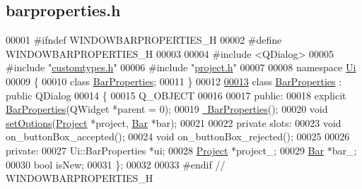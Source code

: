 \hypertarget{barproperties_8h_source}{}\subsection{barproperties.\+h}
\label{barproperties_8h_source}

\begin{DoxyCode}
00001 \textcolor{preprocessor}{#ifndef WINDOWBARPROPERTIES\_H}
00002 \textcolor{preprocessor}{#define WINDOWBARPROPERTIES\_H}
00003 
00004 \textcolor{preprocessor}{#include <QDialog>}
00005 \textcolor{preprocessor}{#include "\hyperlink{customtypes_8h}{customtypes.h}"}
00006 \textcolor{preprocessor}{#include "\hyperlink{project_8h}{project.h}"}
00007 
00008 \textcolor{keyword}{namespace }\hyperlink{namespace_ui}{Ui}
00009 \{
00010 \textcolor{keyword}{class }\hyperlink{class_bar_properties}{BarProperties};
00011 \}
00012 
\hypertarget{barproperties_8h_source_l00013}{}\hyperlink{class_bar_properties}{00013} \textcolor{keyword}{class }\hyperlink{class_bar_properties}{BarProperties} : \textcolor{keyword}{public} QDialog
00014 \{
00015   Q\_OBJECT
00016 
00017 \textcolor{keyword}{public}:
00018   \textcolor{keyword}{explicit} \hyperlink{class_bar_properties_a7c14a54f430cabfe872869799076025b}{BarProperties}(QWidget *parent = 0);
00019   \hyperlink{class_bar_properties_a639b4da849970025a2935ee965d6a465}{~BarProperties}();
00020   \textcolor{keywordtype}{void} \hyperlink{class_bar_properties_a80cba99404820272603c4da8fb708c05}{setOptions}(\hyperlink{class_project}{Project} *project, \hyperlink{class_bar}{Bar} *bar);
00021 
00022 \textcolor{keyword}{private} slots:
00023   \textcolor{keywordtype}{void} on\_buttonBox\_accepted();
00024   \textcolor{keywordtype}{void} on\_buttonBox\_rejected();
00025 
00026 \textcolor{keyword}{private}:
00027   Ui::BarProperties *ui;
00028   \hyperlink{class_project}{Project} *project\_;
00029   \hyperlink{class_bar}{Bar} *bar\_;
00030   \textcolor{keywordtype}{bool} isNew;
00031 \};
00032 
00033 \textcolor{preprocessor}{#endif // WINDOWBARPROPERTIES\_H}
\end{DoxyCode}

